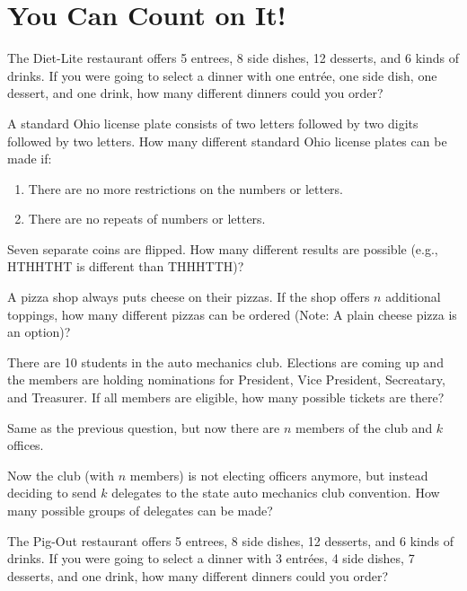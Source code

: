 \newpage
\section{You Can Count on It!}\label{A:countOnIt}

\begin{prob}
The Diet-Lite restaurant offers 5 entrees, 8 side dishes, 12 desserts,
and 6 kinds of drinks.  If you were going to select a dinner with one
entr\'ee, one side dish, one dessert, and one drink, how many different
dinners could you order?
\end{prob}

\begin{prob}
A standard Ohio license plate consists of two letters followed by two
digits followed by two letters.  How many different standard Ohio
license plates can be made if: 
\begin{enumerate}
\item There are no more restrictions on the
numbers or letters.
\item  There are no repeats of numbers or letters.
\end{enumerate}
\end{prob}

\begin{prob}
Seven separate coins are flipped.  How many different results are
possible (e.g., HTHHTHT is different than THHHTTH)?
\end{prob}


\begin{prob}
A pizza shop always puts cheese on their pizzas.  If the shop offers
$n$ additional toppings, how many different pizzas can be ordered
(Note: A plain cheese pizza is an option)?
\end{prob}

\begin{prob}
There are 10 students in the auto mechanics club.  Elections are
coming up and the members are holding nominations for President, Vice
President, Secreatary, and Treasurer.  If all members are eligible,
how many possible tickets are there?
\end{prob}

\begin{prob}
Same as the previous question, but now there are $n$ members of the club
and $k$ offices.
\end{prob}


\begin{prob}
Now the club (with $n$ members) is not electing officers anymore, but
instead deciding to send $k$ delegates to the state auto mechanics
club convention.  How many possible groups of delegates can be made?
\end{prob}

\begin{prob}
The Pig-Out restaurant offers 5 entrees, 8 side dishes, 12 desserts,
and 6 kinds of drinks.  If you were going to select a dinner with 3
entr\'ees, 4 side dishes, 7 desserts, and one drink, how many
different dinners could you order?
\end{prob}
